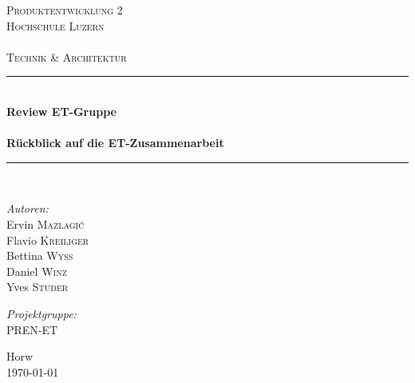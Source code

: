 \begin{titlepage}

\begin{center}

\textsc{\LARGE Produktentwicklung 2}\\[1.5cm]

\textsc{\Large Hochschule Luzern\\
    ~\\
    Technik \& Architektur}\\[0.5cm]

\vfill{}

\newcommand{\HRule}{\rule{\linewidth}{0.5mm}}
\HRule \\[0.4cm]
{   \Huge \bfseries Review ET-Gruppe\\
        ~\\
        \large Rückblick auf die ET-Zusammenarbeit}\\[0.4cm]

\HRule \\[1.5cm]

\begin{minipage}[t]{0.4\textwidth}
    \begin{flushleft} \large
        \emph{Autoren:}\\
        Ervin \textsc{Mazlagi\'c}\\
        Flavio \textsc{Kreiliger}\\
        Bettina \textsc{Wyss}\\
        Daniel \textsc{Winz}\\
        Yves \textsc{Studer}\\
    \end{flushleft}
\end{minipage}
\hfill
\begin{minipage}[t]{0.4\textwidth}
    \begin{flushright} \large
        \emph{Projektgruppe:} \\
        PREN-ET
    \end{flushright}
\end{minipage}

\vfill{}
\vfill{}
\vfill{}

{\large Horw\\ \today}

\end{center}

\end{titlepage}
